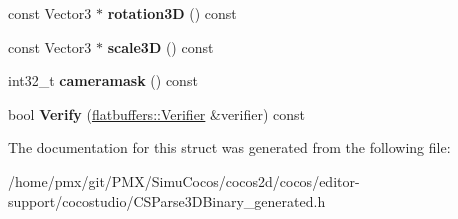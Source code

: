 \begin{DoxyCompactItemize}
\mbox{\label{structflatbuffers_1_1Node3DOption_a412ed429f9d609c7e9863565e7e72a17}} 
const Vector3 $\ast$ {\bfseries rotation3D} () const
\item 
\mbox{\label{structflatbuffers_1_1Node3DOption_aa0873a4858c9bc79365fd09ae85220de}} 
const Vector3 $\ast$ {\bfseries scale3D} () const
\item 
\mbox{\label{structflatbuffers_1_1Node3DOption_a88500ccdea1e1bfb69e41996e08c1a6a}} 
int32\+\_\+t {\bfseries cameramask} () const
\item 
\mbox{\label{structflatbuffers_1_1Node3DOption_a32bede007a73eeb5766aff94c183144b}} 
bool {\bfseries Verify} (\hyperlink{classflatbuffers_1_1Verifier}{flatbuffers\+::\+Verifier} \&verifier) const
\end{DoxyCompactItemize}


The documentation for this struct was generated from the following file\+:\begin{DoxyCompactItemize}
\item 
/home/pmx/git/\+P\+M\+X/\+Simu\+Cocos/cocos2d/cocos/editor-\/support/cocostudio/C\+S\+Parse3\+D\+Binary\+\_\+generated.\+h\end{DoxyCompactItemize}
